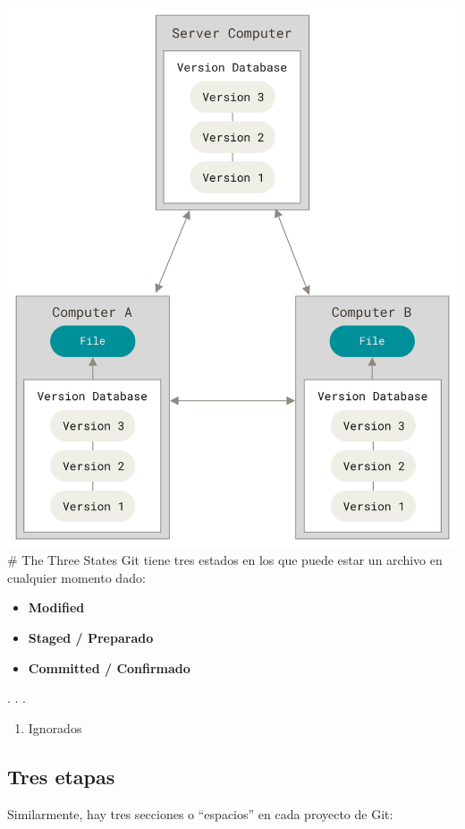 \includegraphics{figs/distributed.png} \# The Three States Git tiene
tres estados en los que puede estar un archivo en cualquier momento
dado:

\begin{itemize}
\item
  \textbf{Modified}
\item
  \textbf{Staged / Preparado}
\item
  \textbf{Committed / Confirmado}
\end{itemize}

. . .

\begin{enumerate}
\def\labelenumi{\arabic{enumi}.}
\tightlist
\item
  Ignorados
\end{enumerate}

\subsection{Tres etapas}

Similarmente, hay tres secciones o ``espacios'' en cada proyecto de Git:

